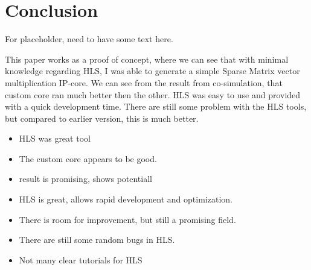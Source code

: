 \chapter{Conclusion}
For placeholder, need to have some text here. 

This paper works as a proof of concept, where we can see that with minimal knowledge regarding HLS, I was able to generate a simple Sparse Matrix vector multiplication IP-core. We can see from the result from co-simulation, that custom core ran much better then the other. HLS was easy to use and provided with a quick development time. There are still some problem with the HLS tools, but compared to earlier version, this is much better.

\begin{itemize}
\item HLS was great tool
\item The custom core appears to be good. 
\item result is promising, shows potentiall
\item HLS is great, allows rapid development and optimization.
\item There is room for improvement, but still a promising field.
\item There are still some random bugs in HLS.
\item Not many clear tutorials for HLS
\end{itemize}